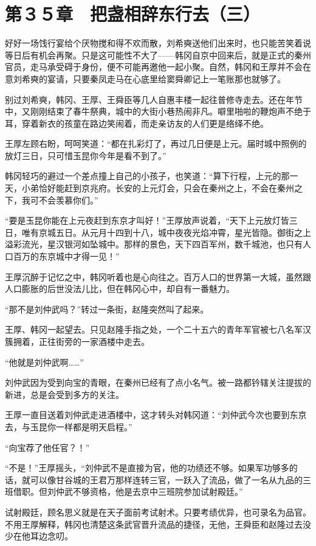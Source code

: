 \section{第３５章　把盏相辞东行去（三）}

好好一场饯行宴给个厌物搅和得不欢而散，刘希奭送他们出来时，也只能苦笑着说等日后有机会再聚。只是这可能性不大了——韩冈自京中回来后，就是正式的秦州官员，走马承受碍于身份，便不可能再邀他一起小聚。自然，韩冈和王厚并不会在意刘希奭的宴请，只要秦凤走马在心底里给窦舜卿记上一笔账那也就够了。

别过刘希奭，韩冈、王厚、王舜臣等几人自惠丰楼一起往普修寺走去。还在年节中，又刚刚结束了春牛祭典，城中的大街小巷热闹非凡。噼里啪啦的鞭炮声不绝于耳，穿着新衣的孩童在路边笑闹着，而走亲访友的人们更是络绎不绝。

王厚左顾右盼，呵呵笑道：“都在扎彩灯了，再过几日便是上元。届时城中照例的放灯三日，只可惜玉昆你今年是看不到了。”

韩冈轻巧的避过一个差点撞上自己的小孩子，也笑道：“算下行程，上元的那一天，小弟恰好能赶到京兆府。长安的上元灯会，只会在秦州之上，不会在秦州之下，我可不会羡慕你们。”

“要是玉昆你能在上元夜赶到东京才叫好！”王厚放声说着，“天下上元放灯皆三日，唯有京城五日。从元月十四到十八，城中夜夜光焰冲霄，星光皆隐。御街之上溢彩流光，星汉银河如坠城中。那样的景色，天下四百军州，数千城池，也只有人口百万的东京城中才得一见！”

王厚沉醉于记忆之中，韩冈听着也是心向往之。百万人口的世界第一大城，虽然跟人口膨胀的后世没法儿比，但在韩冈心中，却自有一番魅力。

“那不是刘仲武吗？”转过一条街，赵隆突然叫了起来。

王厚、韩冈一起望去。只见赵隆手指之处，一个二十五六的青年军官被七八名军汉簇拥着，正往街旁的一家酒楼中走去。

“他就是刘仲武啊……”

刘仲武因为受到向宝的青眼，在秦州已经有了点小名气。被一路都钤辖关注提拔的新进，总是会受到多方的关注。

王厚一直目送着刘仲武走进酒楼中，这才转头对韩冈道：“刘仲武今次也要到东京去，与玉昆你一样都是明天启程。”

“向宝荐了他任官？！”

“不是！”王厚摇头，“刘仲武不是直接为官，他的功绩还不够。如果军功够多的话，就可以像甘谷城的王君万那样连转三官，一跃入了流品，做了一名从九品的三班借职。但刘仲武不够资格，他是去京中三班院参加试射殿廷。”

试射殿廷，顾名思义就是在天子面前考试射术。只要考绩优异，也可录名为品官。不用王厚解释，韩冈也清楚这条武官晋升流品的捷径，无他，王舜臣和赵隆过去没少在他耳边念叨。

